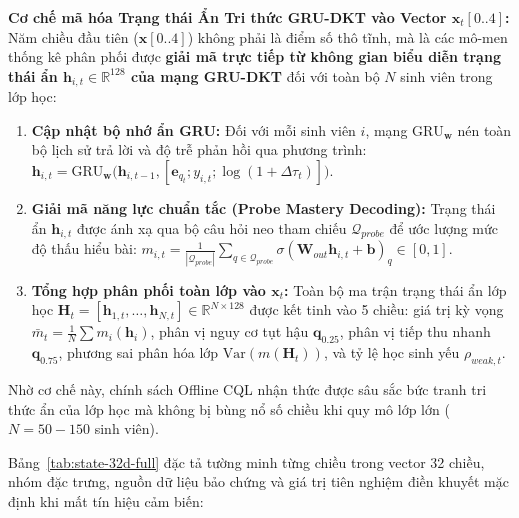 \noindent\textbf{Cơ chế mã hóa Trạng thái Ẩn Tri thức GRU-DKT vào Vector $\mathbf{x}_t[0..4]$:}
Năm chiều đầu tiên ($\mathbf{x}[0..4]$) không phải là điểm số thô tĩnh, mà là các mô-men thống kê phân phối được \textbf{giải mã trực tiếp từ không gian biểu diễn trạng thái ẩn $\mathbf{h}_{i, t} \in \mathbb{R}^{128}$ của mạng GRU-DKT} đối với toàn bộ $N$ sinh viên trong lớp học:
\begin{enumerate}[label=\textbf{(\alph*)}]
  \item \textbf{Cập nhật bộ nhớ ẩn GRU:} Đối với mỗi sinh viên $i$, mạng $\text{GRU}_{\mathbf{w}}$ nén toàn bộ lịch sử trả lời và độ trễ phản hồi qua phương trình: $\mathbf{h}_{i, t} = \text{GRU}_{\mathbf{w}}\big(\mathbf{h}_{i, t-1}, [\mathbf{e}_{q_t}; y_{i, t}; \log(1 + \Delta\tau_t)]\big)$.
  \item \textbf{Giải mã năng lực chuẩn tắc (Probe Mastery Decoding):} Trạng thái ẩn $\mathbf{h}_{i, t}$ được ánh xạ qua bộ câu hỏi neo tham chiếu $\mathcal{Q}_{probe}$ để ước lượng mức độ thấu hiểu bài: $m_{i, t} = \frac{1}{|\mathcal{Q}_{probe}|}\sum_{q \in \mathcal{Q}_{probe}} \sigma(\mathbf{W}_{out}\mathbf{h}_{i, t} + \mathbf{b})_q \in [0, 1]$.
  \item \textbf{Tổng hợp phân phối toàn lớp vào $\mathbf{x}_t$:} Toàn bộ ma trận trạng thái ẩn lớp học $\mathbf{H}_t = [\mathbf{h}_{1, t}, \dots, \mathbf{h}_{N, t}] \in \mathbb{R}^{N \times 128}$ được kết tinh vào 5 chiều: giá trị kỳ vọng $\bar{m}_t = \frac{1}{N}\sum m_i(\mathbf{h}_i)$, phân vị nguy cơ tụt hậu $\mathbf{q}_{0.25}$, phân vị tiếp thu nhanh $\mathbf{q}_{0.75}$, phương sai phân hóa lớp $\text{Var}(m(\mathbf{H}_t))$, và tỷ lệ học sinh yếu $\rho_{weak, t}$.
\end{enumerate}
Nhờ cơ chế này, chính sách Offline CQL nhận thức được sâu sắc bức tranh tri thức ẩn của lớp học mà không bị bùng nổ số chiều khi quy mô lớp lớn ($N = 50 - 150$ sinh viên).

Bảng~\ref{tab:state-32d-full} đặc tả tường minh từng chiều trong vector 32 chiều, nhóm đặc trưng, nguồn dữ liệu bảo chứng và giá trị tiên nghiệm điền khuyết mặc định khi mất tín hiệu cảm biến:

